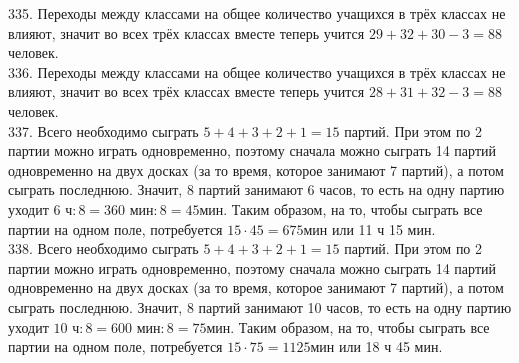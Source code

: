 \documentclass[12pt]{article}
\begin{document}
335. Переходы между классами на общее количество учащихся в трёх классах не влияют, значит во всех трёх классах вместе теперь учится $29+32+30-3=88$ человек.\\
336. Переходы между классами на общее количество учащихся в трёх классах не влияют, значит во всех трёх классах вместе теперь учится $28+31+32-3=88$ человек.\\
337. Всего необходимо сыграть $5+4+3+2+1=15$ партий. При этом по 2 партии можно играть одновременно, поэтому сначала можно сыграть 14 партий одновременно на двух досках (за то время, которое занимают 7 партий), а потом сыграть последнюю. Значит, 8 партий занимают 6 часов, то есть на одну партию уходит $6\text{ ч}:8= 360\text{ мин}:8=45$мин. Таким образом, на то, чтобы сыграть все партии на одном поле, потребуется $15\cdot45=675$мин или 11 ч 15 мин.\\
338. Всего необходимо сыграть $5+4+3+2+1=15$ партий. При этом по 2 партии можно играть одновременно, поэтому сначала можно сыграть 14 партий одновременно на двух досках (за то время, которое занимают 7 партий), а потом сыграть последнюю. Значит, 8 партий занимают 10 часов, то есть на одну партию уходит $10\text{ ч}:8= 600\text{ мин}:8=75$мин. Таким образом, на то, чтобы сыграть все партии на одном поле, потребуется $15\cdot75=1125$мин или 18 ч 45 мин.
\newpage
\end{document}
